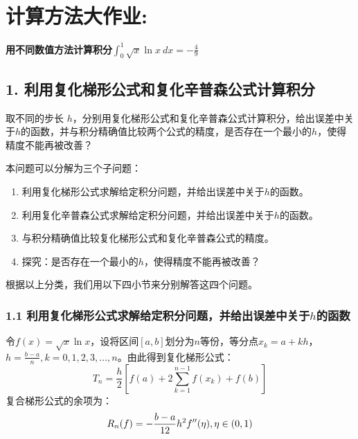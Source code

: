 
\chapter{计算方法大作业:}
\begin{center}
    \textbf{用不同数值方法计算积分$\int_{0}^{1} \sqrt{x} \ln x  \ dx = -\frac{4}{9}$}
\end{center}

\section*{1. 利用复化梯形公式和复化辛普森公式计算积分}

取不同的步长 $h$，分别用复化梯形公式和复化辛普森公式计算积分，给出误差中关于$h$的函数，并与积分精确值比较两个公式的精度，是否存在一个最小的$h$，使得精度不能再被改善？

本问题可以分解为三个子问题：
\begin{enumerate}
    \item 利用复化梯形公式求解给定积分问题，并给出误差中关于$h$的函数。
    \item 利用复化辛普森公式求解给定积分问题，并给出误差中关于$h$的函数。
    \item 与积分精确值比较复化梯形公式和复化辛普森公式的精度。
    \item 探究：是否存在一个最小的$h$，使得精度不能再被改善？
\end{enumerate}

根据以上分类，我们用以下四小节来分别解答这四个问题。

\subsection*{1.1 利用复化梯形公式求解给定积分问题，并给出误差中关于$h$的函数}

令$f(x) = \sqrt{x} \ln x$，设将区间$[a,b]$划分为$n$等份，等分点$x_k = a + kh$，$h = \frac{b-a}{n},k=0,1,2,3,...,n$。由此得到复化梯形公式：
\begin{equation}
    T_n = \frac{h}{2} [f(a) + 2\sum_{k=1}^{n-1} f(x_k) + f(b) ]
    \label{eq:compound_trapezoid_general}
\end{equation}
复合梯形公式的余项为：
\begin{equation}
    R_n(f) = -\frac{b-a}{12} h^2 f^{\prime\prime} (\eta), \\ \eta\in(0,1)
    \label{eq:compound_trapezoid_R_general}
\end{equation}


